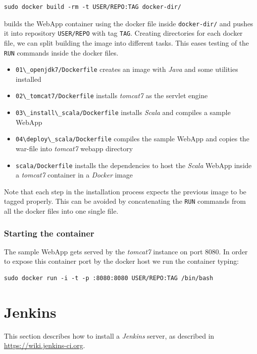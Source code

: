 \documentclass[11pt]{article}
\begin{document}
\begin{verbatim}
sudo docker build -rm -t USER/REPO:TAG docker-dir/
\end{verbatim}
builds the WebApp container using the docker file inside \texttt{docker-dir/} and pushes it into repository \texttt{USER/REPO} with tag \texttt{TAG}. Creating directories for each docker file, we can split building the image into different tasks. This eases testing of the \texttt{RUN} commands inside the docker files. 
\begin{itemize}
\item \texttt{01\textbackslash{}\_openjdk7/Dockerfile} creates an image with \emph{Java} and some utilities installed
\item \texttt{02\textbackslash{}\_tomcat7/Dockerfile} installs \emph{tomcat7} as the servlet engine
\item \texttt{03\textbackslash{}\_install\textbackslash{}\_scala/Dockerfile} installs \emph{Scala} and compiles a sample WebApp
\item \texttt{04\textbackslash{}deploy\textbackslash{}\_scala/Dockerfile}  compiles the sample WebApp and copies the war-file into \emph{tomcat7} webapp directory
\item \texttt{scala/Dockerfile} installs the dependencies to host the \emph{Scala} WebApp inside a \emph{tomcat7} container in a \emph{Docker} image
\end{itemize}

Note that each step in the installation process expects the previous image to be tagged properly. This can be avoided by concatenating the \texttt{RUN} commands from all the docker files into one single file.
\subsubsection{Starting the container}
\label{sec-4-5-2}

The sample WebApp gets served by the \emph{tomcat7} instance on port 8080. In order to expose this container port by the docker host we run the container  typing:

\begin{verbatim}
sudo docker run -i -t -p :8080:8080 USER/REPO:TAG /bin/bash
\end{verbatim}
\section{Jenkins}
\label{sec-5}

This section describes how to install a \emph{Jenkins} server, as described in \href{https://wiki.jenkins-ci.org/display/JENKINS/Installing%2BJenkins%2Bon%2BUbuntu}{https://wiki.jenkins-ci.org}. 
\end{document}
